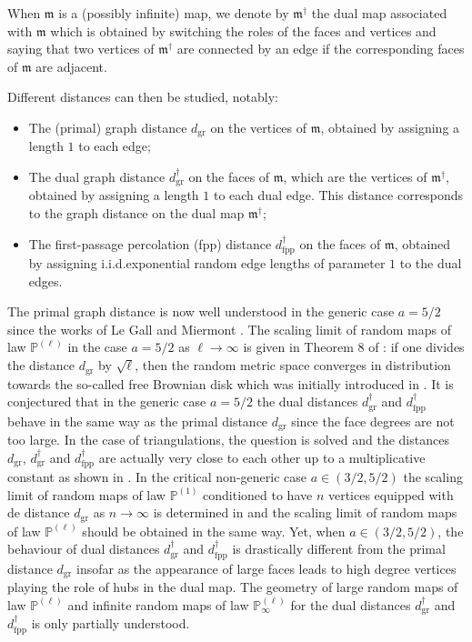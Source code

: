 \documentclass[11pt]{article}
\numberwithin{equation}{section}
\def\P{\mathbb{P}}
\begin{document}
{When $\mathfrak{m}$ is a (possibly infinite) map, we denote by $\mathfrak{m}^\dagger$ the dual map associated with $\mathfrak{m}$} which is obtained by switching the roles of the faces and vertices and saying that two vertices of $\mathfrak{m}^\dagger$ are connected by an edge if the corresponding faces of $\mathfrak{m}$ are adjacent. {Different distances can then be studied, notably:
	\begin{itemize}
		\item The (primal) graph distance $d_\mathrm{gr}$ on the vertices of $\mathfrak{m}$, obtained by assigning a length $1$ to each edge;
		\item The dual graph distance $d_\mathrm{gr}^\dagger$ on the faces of $\mathfrak{m}$, which are the vertices of $\mathfrak{m}^\dagger$, obtained by assigning a length $1$ to each dual edge. This distance corresponds to the graph distance on the dual map $\mathfrak{m}^\dagger$;
		\item The first-passage percolation (fpp) distance $d^\dagger_{\mathrm{fpp}}$ on the faces of $\mathfrak{m}$, obtained by assigning i.i.d.\@ exponential random edge lengths of parameter $1$ to the dual edges.
\end{itemize}}
{The primal graph distance is now well understood in the generic case $a=5/2$ since the works of Le Gall \cite{LG13} and Miermont \cite{Mie13}. The scaling limit of random maps of law $\P^{(\ell)}$ in the case $a=5/2$ as $\ell \to \infty$ is given in Theorem 8 of \cite{BM17}: if one divides the distance $d_\mathrm{gr}$ by $\sqrt{\ell}$, then the random metric space converges in distribution towards the so-called free Brownian disk which was initially introduced in \cite{Bett15}. It is conjectured that in the generic case $a=5/2$ the dual distances $d^\dagger_\mathrm{gr}$ and $d^\dagger_\mathrm{fpp}$ behave in the same way as the primal distance $d_\mathrm{gr}$ since the face degrees are not too large. In the case of triangulations, the question is solved and the distances $d_\mathrm{gr}$, $d^\dagger_\mathrm{gr}$ and $d^\dagger_\mathrm{fpp}$ are actually very close to each other up to a multiplicative constant as shown in \cite{CLG19}. In the critical non-generic case $a \in (3/2,5/2)$ the scaling limit of random maps of law $\P^{(1)}$ conditioned to have $n$ vertices equipped with de distance $d_\mathrm{gr}$ as $n \to \infty$ is determined in \cite{CMR25} and the scaling limit of random maps of law $\P^{(\ell)}$ should be obtained in the same way. Yet, when $a \in (3/2,5/2)$, the behaviour of dual distances $d^\dagger_\mathrm{gr}$ and $d^\dagger_\mathrm{fpp}$ is drastically different from the primal distance $d_\mathrm{gr}$ insofar as the appearance of large faces leads to high degree vertices playing the role of hubs in the dual map. The geometry of large random maps of law $\P^{(\ell)}$ and infinite random maps of law $\P^{(\ell)}_\infty$ for the dual distances  $d^\dagger_\mathrm{gr}$ and $d^\dagger_\mathrm{fpp}$ is only partially understood. }
\end{document}
